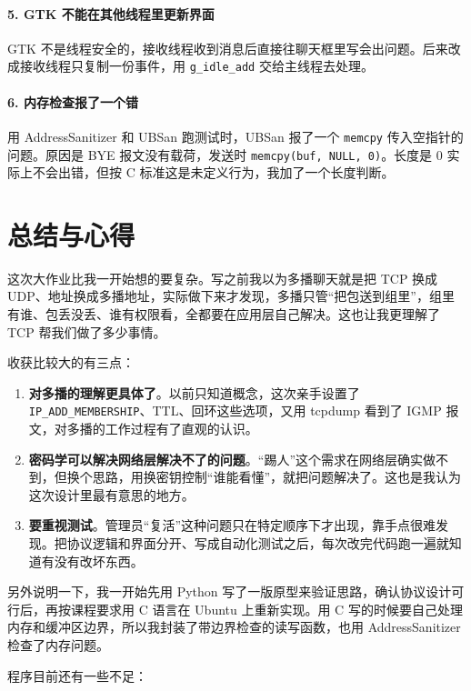 \documentclass[a4paper,zihao=-4]{ctexart}
\newcommand{\inl}[1]{\texttt{#1}}
\begin{document}
\paragraph{5. GTK 不能在其他线程里更新界面}
GTK 不是线程安全的，接收线程收到消息后直接往聊天框里写会出问题。后来改成接收线程只复制一份事件，用 \inl{g\_idle\_add} 交给主线程去处理。

\paragraph{6. 内存检查报了一个错}
用 AddressSanitizer 和 UBSan 跑测试时，UBSan 报了一个 \inl{memcpy} 传入空指针的问题。原因是 BYE 报文没有载荷，发送时 \inl{memcpy(buf, NULL, 0)}。长度是 0 实际上不会出错，但按 C 标准这是未定义行为，我加了一个长度判断。

\section{总结与心得}

这次大作业比我一开始想的要复杂。写之前我以为多播聊天就是把 TCP 换成 UDP、地址换成多播地址，实际做下来才发现，多播只管“把包送到组里”，组里有谁、包丢没丢、谁有权限看，全都要在应用层自己解决。这也让我更理解了 TCP 帮我们做了多少事情。

收获比较大的有三点：

\begin{enumerate}
  \item \textbf{对多播的理解更具体了}。以前只知道概念，这次亲手设置了 \inl{IP\_ADD\_MEMBERSHIP}、TTL、回环这些选项，又用 tcpdump 看到了 IGMP 报文，对多播的工作过程有了直观的认识。
  \item \textbf{密码学可以解决网络层解决不了的问题}。“踢人”这个需求在网络层确实做不到，但换个思路，用换密钥控制“谁能看懂”，就把问题解决了。这也是我认为这次设计里最有意思的地方。
  \item \textbf{要重视测试}。管理员“复活”这种问题只在特定顺序下才出现，靠手点很难发现。把协议逻辑和界面分开、写成自动化测试之后，每次改完代码跑一遍就知道有没有改坏东西。
\end{enumerate}

另外说明一下，我一开始先用 Python 写了一版原型来验证思路，确认协议设计可行后，再按课程要求用 C 语言在 Ubuntu 上重新实现。用 C 写的时候要自己处理内存和缓冲区边界，所以我封装了带边界检查的读写函数，也用 AddressSanitizer 检查了内存问题。

程序目前还有一些不足：
\end{document}
